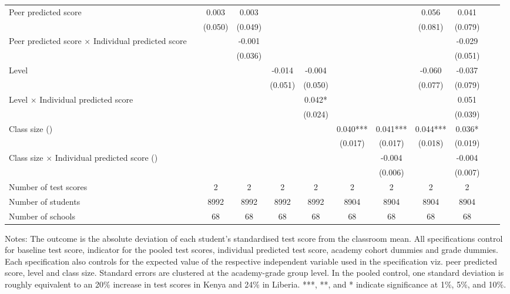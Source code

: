 \begin{center}
\begin{scriptsize}
\begin{threeparttable}
\begin{tabular} {@{} l l c c c c c c c c c c  @{}}
\\
Peer predicted score &  & 0.003 & 0.003 &  &  &  &  & 0.056 & 0.041 \\
                 &  & (0.050) & (0.049) &  &  &  &  & (0.081) & (0.079) \\
Peer predicted score $\times$ Individual predicted score &  &  & -0.001 &  &  &  &  &  & -0.029 \\
                 &  &  & (0.036) &  &  &  &  &  & (0.051) \\
Level &  &  &  & -0.014 & -0.004 &  &  & -0.060 & -0.037 \\
                 &  &  &  & (0.051) & (0.050) &  &  & (0.077) & (0.079) \\
Level $\times$ Individual predicted score &  &  &  &  & 0.042* &  &  &  & 0.051 \\
                 &  &  &  &  & (0.024) &  &  &  & (0.039) \\
Class size (\times 10) &  &  &  &  &  & 0.040*** & 0.041*** & 0.044*** & 0.036* \\
                 &  &  &  &  &  & (0.017) & (0.017) & (0.018) & (0.019) \\
Class size $\times$ Individual predicted score (\times 10) &  &  &  &  &  &  & -0.004 &  & -0.004 \\
                 &  &  &  &  &  &  & (0.006) &  & (0.007) \\
\midrule
Number of test scores &  & 2 & 2 & 2 & 2 & 2 & 2 & 2 & 2 \\
Number of students &  & 8992 & 8992 & 8992 & 8992 & 8904 & 8904 & 8904 & 8904 \\
Number of schools &  & 68 & 68 & 68 & 68 & 68 & 68 & 68 & 68 \\
\bottomrule
\end{tabular}
\begin{tablenotes}
\item Notes: The outcome is the absolute deviation of each student's standardised test score from the classroom mean. All specifications control for baseline test score, indicator for the pooled test scores, individual predicted test score, academy cohort dummies and grade dummies. Each specification also controls for the expected value of the respective independent variable used in the specification viz. peer predicted score, level and class size. Standard errors are clustered at the academy-grade group level. In the pooled control, one standard deviation is roughly equivalent to an 20\% increase in test scores in Kenya and 24\% in Liberia. ***, **, and * indicate significance at 1\%, 5\%, and 10\%.\end{tablenotes}
\end{threeparttable}
\end{scriptsize}
\end{center}
\clearpage
